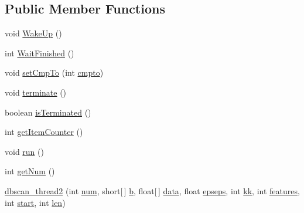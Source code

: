 \subsection*{Public Member Functions}
\begin{DoxyCompactItemize}
\item 
void \mbox{\hyperlink{classcom_1_1example_1_1dmocl_1_1dbscan_1_1dbscan__thread2_af96c235862b0e2ff6a364af572ddba8a}{Wake\+Up}} ()
\item 
int \mbox{\hyperlink{classcom_1_1example_1_1dmocl_1_1dbscan_1_1dbscan__thread2_a0098eeeb00ce1933c110b233c62e4ac9}{Wait\+Finished}} ()
\item 
void \mbox{\hyperlink{classcom_1_1example_1_1dmocl_1_1dbscan_1_1dbscan__thread2_a1d63761be9c1404a20230e85831ebc98}{set\+Cmp\+To}} (int \mbox{\hyperlink{classcom_1_1example_1_1dmocl_1_1dbscan_1_1dbscan__thread2_ad857c20706749d220416cf6d5bfa8925}{cmpto}})
\item 
void \mbox{\hyperlink{classcom_1_1example_1_1dmocl_1_1dbscan_1_1dbscan__thread2_a6ef50cfd061325ea4eb638313f5ab61f}{terminate}} ()
\item 
boolean \mbox{\hyperlink{classcom_1_1example_1_1dmocl_1_1dbscan_1_1dbscan__thread2_a55252f5d50a53fef18f680bd06cd2fa6}{is\+Terminated}} ()
\item 
int \mbox{\hyperlink{classcom_1_1example_1_1dmocl_1_1dbscan_1_1dbscan__thread2_abebcc9863856e96bdf53b8102284ce99}{get\+Item\+Counter}} ()
\item 
void \mbox{\hyperlink{classcom_1_1example_1_1dmocl_1_1dbscan_1_1dbscan__thread2_a9d1bee8d6d7cbddff2344f16462ca465}{run}} ()
\item 
int \mbox{\hyperlink{classcom_1_1example_1_1dmocl_1_1dbscan_1_1dbscan__thread2_a19acf9510dcb9e5f5f4be8cc61dcc39f}{get\+Num}} ()
\item 
\mbox{\hyperlink{classcom_1_1example_1_1dmocl_1_1dbscan_1_1dbscan__thread2_a8b5b4be896a0e7efb9f9f7fe0c8ccfeb}{dbscan\+\_\+thread2}} (int \mbox{\hyperlink{classcom_1_1example_1_1dmocl_1_1dbscan_1_1dbscan__thread2_a8c3589585ee7d3dffb56f2815e4cfe5e}{num}}, short\mbox{[}$\,$\mbox{]} \mbox{\hyperlink{classcom_1_1example_1_1dmocl_1_1dbscan_1_1dbscan__thread2_a1eb51ad414e8ce37f6fc7a366a9631f9}{b}}, float\mbox{[}$\,$\mbox{]} \mbox{\hyperlink{classcom_1_1example_1_1dmocl_1_1dbscan_1_1dbscan__thread2_a1e074f4d486050d2cdd34f11340163d9}{data}}, float \mbox{\hyperlink{classcom_1_1example_1_1dmocl_1_1dbscan_1_1dbscan__thread2_a925553795864906a7e2b06f30d377e6a}{epseps}}, int \mbox{\hyperlink{classcom_1_1example_1_1dmocl_1_1dbscan_1_1dbscan__thread2_a20cf1118178a289fb4f6a4cf0ae79781}{kk}}, int \mbox{\hyperlink{classcom_1_1example_1_1dmocl_1_1dbscan_1_1dbscan__thread2_af7a32b720e9757e7ea87de852cb928fa}{features}}, int \mbox{\hyperlink{classcom_1_1example_1_1dmocl_1_1dbscan_1_1dbscan__thread2_a069afa516eb9cd0c10e2bd860a97475c}{start}}, int \mbox{\hyperlink{classcom_1_1example_1_1dmocl_1_1dbscan_1_1dbscan__thread2_a3f37b04b0d50bc1a313285cc42c97b52}{len}})
\end{DoxyCompactItemize}
